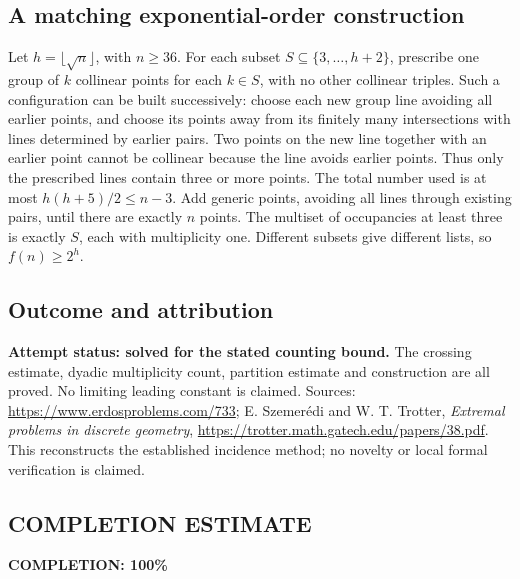 \subsection*{A matching exponential-order construction}
Let $h=\lfloor\sqrt n\rfloor$, with $n\geq36$. For each subset $S\subseteq\{3,\ldots,h+2\}$, prescribe one group of $k$ collinear points for each $k\in S$, with no other collinear triples. Such a configuration can be built successively: choose each new group line avoiding all earlier points, and choose its points away from its finitely many intersections with lines determined by earlier pairs. Two points on the new line together with an earlier point cannot be collinear because the line avoids earlier points. Thus only the prescribed lines contain three or more points.
The total number used is at most $h(h+5)/2\leq n-3$. Add generic points, avoiding all lines through existing pairs, until there are exactly $n$ points. The multiset of occupancies at least three is exactly $S$, each with multiplicity one. Different subsets give different lists, so $f(n)\geq2^h$.

\subsection*{Outcome and attribution}
\textbf{Attempt status: solved for the stated counting bound.} The crossing estimate, dyadic multiplicity count, partition estimate and construction are all proved. No limiting leading constant is claimed.
Sources: \url{https://www.erdosproblems.com/733}; E. Szemer\'edi and W. T. Trotter, \emph{Extremal problems in discrete geometry}, \url{https://trotter.math.gatech.edu/papers/38.pdf}. This reconstructs the established incidence method; no novelty or local formal verification is claimed.

\subsection*{COMPLETION ESTIMATE}
\textbf{COMPLETION: 100\%}
